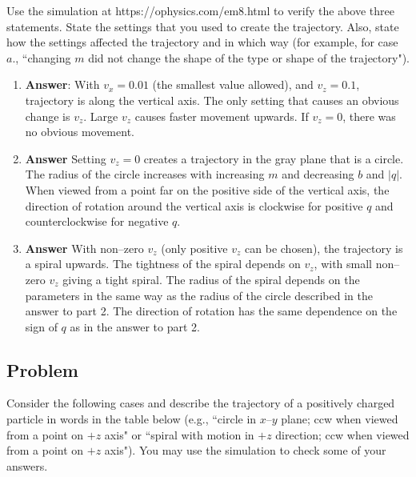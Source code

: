 \documentclass{article}
\begin{document}
Use the simulation at https://ophysics.com/em8.html to verify the above three statements. State the settings that you used to create the trajectory. Also, state how the settings affected the trajectory and in which way (for example, for case $a.$, ``changing $m$ did not change the shape of the type or shape of the trajectory").

\begin{enumerate}

  \item 

        \ifsolutions
        \textbf{Answer}: With $v_x=0.01$ (the smallest value allowed), and $v_z=0.1$, trajectory is along the vertical axis. The only setting that causes an obvious change is $v_z$. Large $v_z$ causes faster movement upwards. If $v_z=0$, there was no obvious movement.
        \else
        \vskip 120pt
        \fi

  \item 

        \ifsolutions
        \textbf{Answer} Setting $v_z=0$ creates a trajectory in the gray plane that is a circle. The radius of the circle increases with increasing $m$ and decreasing $b$ and $|q|$. When viewed from a point far on the positive side of the vertical axis, the direction of rotation around the vertical axis is clockwise for positive $q$ and counterclockwise for negative $q$.
        \else
        \vskip 120pt
        \fi

  \item 

        \ifsolutions
        \textbf{Answer} With non--zero $v_z$ (only positive $v_z$ can be chosen), the trajectory is a spiral upwards. The tightness of the spiral depends on $v_z$, with small non--zero $v_z$ giving a tight spiral. The radius of the spiral depends on the parameters in the same way as the radius of the circle described in the answer to part 2. The direction of rotation has the same dependence on the sign of $q$ as in the answer to part 2.
        \else
        \vskip 120pt
        \fi

\end{enumerate}

\subsection{Problem}

Consider the following cases and describe the trajectory of a positively charged particle in words in the table below (e.g., ``circle in $x$--$y$ plane; ccw when viewed from a point on $+z$ axis" or ``spiral with motion in $+z$ direction; ccw when viewed from a point on $+z$ axis"). You may use the simulation to check some of your answers. 
\end{document}

